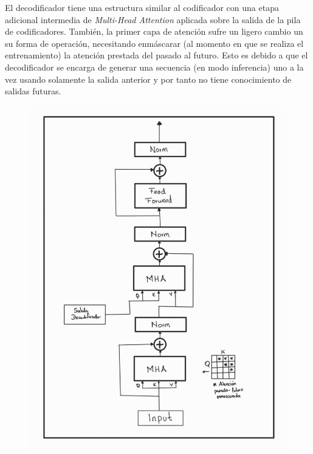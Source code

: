 El decodificador tiene una estructura similar al codificador con una etapa adicional intermedia
de \textit{Multi-Head Attention} aplicada sobre la salida de la pila de codificadores. También, la
primer capa de atención sufre un ligero cambio un su forma de operación, necesitando enmáscarar (al
momento en que se realiza el entrenamiento) la atención prestada del pasado al futuro. Esto es
debido a que el decodificador se encarga de generar una secuencia (en modo inferencia) uno a la vez
usando solamente la salida anterior y por tanto no tiene conocimiento de salidas futuras.

\begin{figure}[ht!]
\centering
    \begin{minipage}{.4\textwidth}
        \centering
        \includegraphics[width=1.0 \textwidth]{Chapters/1. Transformer/Figures/transformer/decoder.jpg}
    \end{minipage}
    \begin{minipage}{.5\textwidth}

\end{minipage}
\end{figure}

